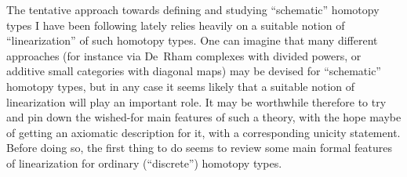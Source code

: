 \label{sec:121}%
The tentative approach towards defining and studying
``schematic'' homotopy types I have been following lately relies
heavily on a suitable notion of ``linearization'' of such homotopy
types. One can imagine that many different approaches (for instance
via De~Rham complexes with divided powers, or additive small
categories with diagonal maps) may be devised for ``schematic''
homotopy types, but in any case it seems likely that a suitable notion
of linearization will play an important role. It may be worthwhile
therefore to try and pin down the wished-for main features of such a
theory, with the hope maybe of getting an axiomatic description for
it, with a corresponding unicity statement. Before doing so, the first
thing to do seems to review some main formal features of linearization
for ordinary (``discrete'') homotopy types.

